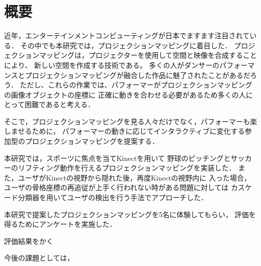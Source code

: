 \chapter*{概要}

近年，エンターテインメントコンピューティングが日本でますます注目されている．
その中でも本研究では，プロジェクションマッピングに着目した．
プロジェクションマッピングは，プロジェクターを使用して空間と映像を合成することにより、
新しい空間を作成する技術である。
多くの人がダンサーのパフォーマンスとプロジェクションマッピングが融合した作品に魅了されたことがあるだろう．
ただし、これらの作業では、パフォーマーがプロジェクションマッピングの画像オブジェクトの座標に
正確に動きを合わせる必要があるため多くの人にとって困難であると考える．

そこで，プロジェクションマッピングを見る人々だけでなく，パフォーマーも楽しませるために，
パフォーマーの動きに応じてインタラクティブに変化する参加型のプロジェクションマッピングを提案する．

本研究では，スポーツに焦点を当てKinectを用いて
野球のピッチングとサッカーのリフティング動作を行えるプロジェクションマッピングを実装した．
また，ユーザがKinectの視野から隠れた後，再度Kinectの視野内に
入った場合，ユーザの骨格座標の再追従が上手く行われない時がある問題に対しては
カスケード分類器を用いてユーザの検出を行う手法でアプローチした．

本研究で提案したプロジェクションマッピングを5名に体験してもらい，
評価を得るためにアンケートを実施した．

評価結果をかく

今後の課題としては，


